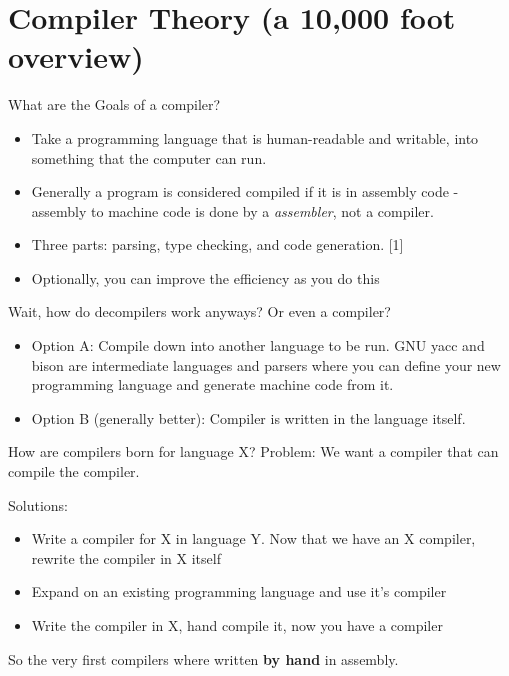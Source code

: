 \documentclass{beamer}
\begin{document}

\section{Compiler Theory (a 10,000 foot overview)}

\begin{frame}{What are the Goals of a compiler?}
  \begin{itemize}
    \item Take a programming language that is human-readable and
      writable, into something that the computer can run.
    \item Generally a program is considered compiled if it is in
      assembly code - assembly to machine code is done by a
      \textit{assembler}, not a compiler.
    \item Three parts: parsing, type checking, and code
      generation. [1]
    \item Optionally, you can improve the efficiency as you do this
  \end{itemize}
\end{frame}

\begin{frame}{Wait, how do decompilers work anyways? Or even a
    compiler?}
  \begin{itemize}
    \item Option A: Compile down into another
      language to be run. GNU yacc and bison are intermediate
      languages and parsers where you can define your new programming
      language and generate machine code from it.
    \item Option B (generally better): Compiler is written in the
      language itself.
  \end{itemize}
\end{frame}

\begin{frame}{How are compilers born for language X?}
  Problem: We want a compiler that can compile the compiler.

  Solutions:
  \begin{itemize}
    \item Write a compiler for X in language Y. Now that we have an X
      compiler, rewrite the compiler in X itself
    \item Expand on an existing programming language and use it's compiler
    \item Write the compiler in X, hand compile it, now you have a
      compiler
  \end{itemize}
  So the very first compilers where written \textbf{by hand} in
  assembly. 
\end{frame}
\end{document}
